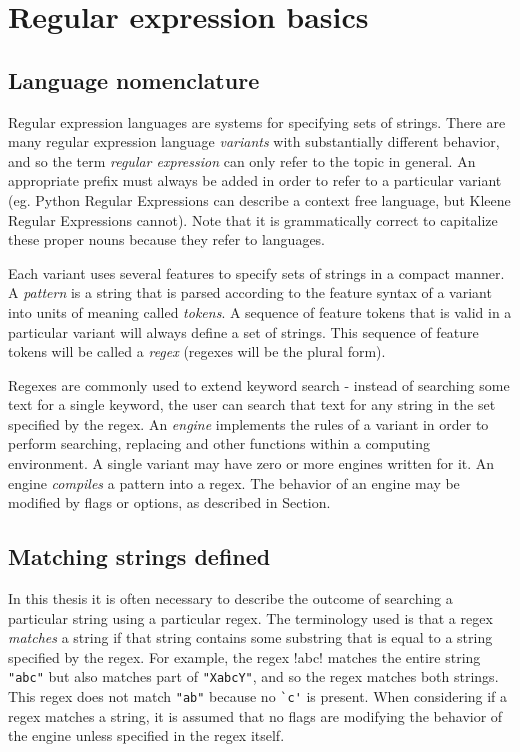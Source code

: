 \section{Regular expression basics}

\subsection{Language nomenclature}
\label{sec:nomenclature}
Regular expression languages are systems for specifying sets of strings.  There are many regular expression language \emph{variants} with substantially different behavior, and so the term \emph{regular expression} can only refer to the topic in general.  An appropriate prefix must always be added in order to refer to a particular variant (eg. Python Regular Expressions can describe a context free language, but Kleene Regular Expressions cannot).  Note that it is grammatically correct to capitalize these proper nouns because they refer to languages.

Each variant uses several features to specify sets of strings in a compact manner.  A \emph{pattern} is a string that is parsed according to the feature syntax of a variant into units of meaning called \emph{tokens}.  A sequence of feature tokens that is valid in a particular variant will always define a set of strings.  This sequence of feature tokens will be called a \emph{regex} (regexes will be the plural form).

Regexes are commonly used to extend keyword search - instead of searching some text for a single keyword, the user can search that text for any string in the set specified by the regex.   An \emph{engine} implements the rules of a variant in order to perform searching, replacing and other functions within a computing environment.  A single variant may have zero or more engines written for it.  An engine \emph{compiles} a pattern into a regex.  The behavior of an engine may be modified by flags or options, as described in Section.

\subsection{Matching strings defined}
In this thesis it is often necessary to describe the outcome of searching a particular string using a particular regex.  The terminology used is that a regex \emph{matches} a string if that string contains some substring that is equal to a string specified by the regex.  For example, the regex \cverb!abc! matches the entire string \verb!"abc"! but also matches part of \verb!"XabcY"!, and so the regex matches both strings.  This regex does not match \verb!"ab"! because no \verb!`c'! is present.  When considering if a regex matches a string, it is assumed that no flags are modifying the behavior of the engine unless specified in the regex itself.

